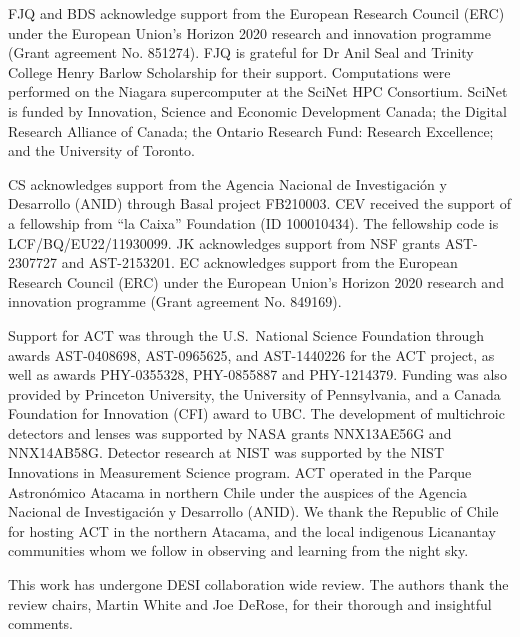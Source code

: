 FJQ and BDS acknowledge support from the European Research Council (ERC) under the European Union’s Horizon 2020 research and innovation programme (Grant agreement No. 851274). 
FJQ is grateful for Dr Anil Seal and Trinity College Henry Barlow Scholarship for their support. 
Computations were performed on the Niagara supercomputer at the SciNet HPC Consortium. SciNet is funded by Innovation, Science and Economic Development Canada; the Digital Research Alliance of Canada; the Ontario Research Fund: Research Excellence; and the University of Toronto.

CS acknowledges support from the Agencia Nacional de Investigaci\'on y Desarrollo (ANID) through Basal project FB210003. CEV received the support of a fellowship from “la Caixa” Foundation (ID 100010434). The fellowship code is LCF/BQ/EU22/11930099. JK acknowledges support from NSF grants AST-2307727 and AST-2153201. EC acknowledges support from the European Research Council (ERC) under the European Union’s Horizon 2020 research and innovation programme (Grant agreement No. 849169).


Support for ACT was through the U.S.~National Science Foundation through awards AST-0408698, AST-0965625, and AST-1440226 for the ACT project, as well as awards PHY-0355328, PHY-0855887 and PHY-1214379. Funding was also provided by Princeton University, the University of Pennsylvania, and a Canada Foundation for Innovation (CFI) award to UBC. The development of multichroic detectors and lenses was supported by NASA grants NNX13AE56G and NNX14AB58G. Detector research at NIST was supported by the NIST Innovations in Measurement Science program. 
ACT operated in the Parque Astron\'omico Atacama in northern Chile under the auspices of the Agencia Nacional de Investigaci\'on y Desarrollo (ANID). We thank the Republic of Chile for hosting ACT in the northern Atacama, and the local indigenous Licanantay communities whom we follow in observing and learning from the night sky.

This work has undergone DESI collaboration wide review. The authors thank the review chairs, Martin White and Joe DeRose, for their thorough and insightful comments. 

